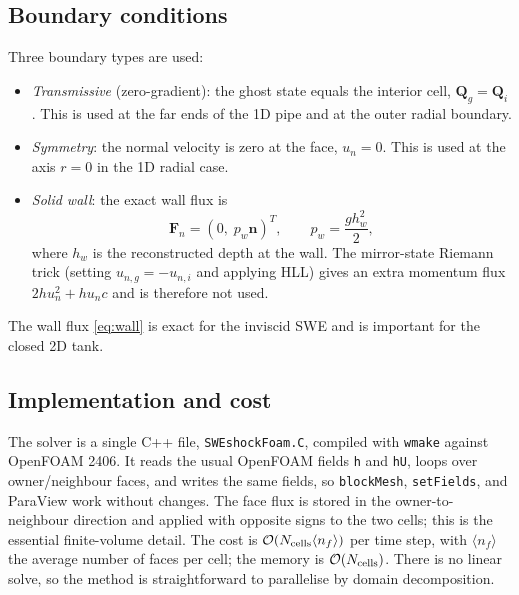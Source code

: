 ﻿\documentclass[11pt,a4paper]{article}
\newcommand{\bn}{\mathbf{n}}
\newcommand{\bF}{\mathbf{F}}
\newcommand{\bQ}{\mathbf{Q}}
\newcommand{\Order}{\mathcal{O}}
\begin{document}
\subsection{Boundary conditions}
Three boundary types are used:
\begin{itemize}[leftmargin=1.4em,itemsep=1pt,topsep=2pt]
\item \emph{Transmissive} (zero-gradient): the ghost state equals the interior
      cell, $\bQ_g=\bQ_i$.  This is used at the far ends of the 1D pipe and at
      the outer radial boundary.
\item \emph{Symmetry}: the normal velocity is zero at the face, $u_n=0$.
      This is used at the axis $r=0$ in the 1D radial case.
\item \emph{Solid wall}: the exact wall flux is
      \begin{equation}
        \bF_n=(0,\;p_w\bn)^T,\qquad p_w=\frac{g h_w^2}{2},
        \label{eq:wall}
      \end{equation}
      where $h_w$ is the reconstructed depth at the wall.  The mirror-state
      Riemann trick (setting $u_{n,g}=-u_{n,i}$ and applying HLL) gives an
      extra momentum flux $2h u_n^2+h u_n c$ and is therefore not used.
\end{itemize}
The wall flux \eqref{eq:wall} is exact for the inviscid SWE and is important
for the closed 2D tank.

\subsection{Implementation and cost}
The solver is a single C++ file, \texttt{SWEshockFoam.C}, compiled with
\texttt{wmake} against OpenFOAM 2406.  It reads the usual OpenFOAM fields
\texttt{h} and \texttt{hU}, loops over owner/neighbour faces, and writes the
same fields, so \texttt{blockMesh}, \texttt{setFields}, and ParaView work
without changes.  The face flux is stored in the owner-to-neighbour direction
and applied with opposite signs to the two cells; this is the essential
finite-volume detail.  The cost is $\Order(N_{\rm cells}\langle n_f\rangle)$
per time step, with $\langle n_f\rangle$ the average number of faces per cell;
the memory is $\Order(N_{\rm cells})$.  There is no linear solve, so the
method is straightforward to parallelise by domain decomposition.
\end{document}
